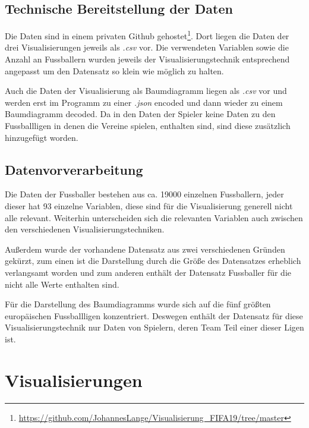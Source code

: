 \documentclass[usegeometry=true]{scrartcl}
\begin{document}
\subsection{Technische Bereitstellung der Daten}
Die Daten sind in einem privaten Github gehostet\footnote{\url{https://github.com/JohannesLange/Visualisierung_FIFA19/tree/master}}. Dort liegen die Daten der drei Visualisierungen jeweils als \textit{.csv} vor. Die verwendeten Variablen sowie die Anzahl an Fussballern wurden jeweils der Visualisierungstechnik entsprechend angepasst um den Datensatz so klein wie möglich zu halten.

Auch die Daten der Visualisierung als Baumdiagramm liegen als \textit{.csv} vor und werden erst im Programm zu einer \textit{.json} encoded und dann wieder zu einem Baumdiagramm decoded. Da in den Daten der Spieler keine Daten zu den Fussballligen in denen die Vereine spielen, enthalten sind, sind diese zusätzlich hinzugefügt worden.

\subsection{\label{Datenvorverarbeitung}Datenvorverarbeitung}

Die Daten der Fussballer bestehen aus ca. 19000 einzelnen Fussballern, jeder dieser hat 93 einzelne Variablen, diese sind für die Visualisierung generell nicht alle relevant. Weiterhin unterscheiden sich die relevanten Variablen auch zwischen den verschiedenen Visualisierungstechniken.

Außerdem wurde der vorhandene Datensatz aus zwei verschiedenen Gründen gekürzt, zum einen ist die Darstellung durch die Größe des Datensatzes erheblich verlangsamt worden und zum anderen enthält der Datensatz Fussballer für die nicht alle Werte enthalten sind.

Für die Darstellung des Baumdiagramms wurde sich auf die fünf größten europäischen Fussballligen konzentriert. Deswegen enthält der Datensatz für diese Visualisierungstechnik nur Daten von Spielern, deren Team Teil einer dieser Ligen ist.

\section{Visualisierungen}
\end{document}
